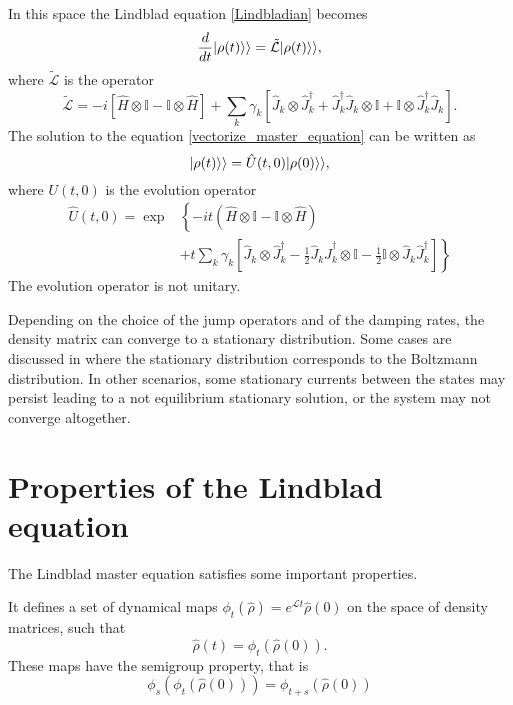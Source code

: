 In this space the Lindblad equation \eqref{Lindbladian} becomes
\begin{equation}\label{vectorize_master_equation}
    \frac{d}{dt}\lvert\rho(t)\rangle\rangle = \tilde{\mathcal{L}}\lvert\rho(t)\rangle\rangle,
\end{equation}
where $\tilde{\mathcal{L}}$ is the operator 
\begin{equation}
    \tilde{\mathcal{L}}=-i\left[\hat H\otimes\mathbb{I}-\mathbb{I}\otimes\hat H\right]+\sum_{k}\gamma_{k}\left[\hat J_{k}\otimes\hat J^\dagger_{k} + \hat J_{k}^\dagger \hat J_{k}\otimes\mathbb{I} +\mathbb{I}\otimes\hat J_{k}^\dagger \hat J_{k}\right].
\end{equation}
The solution to the equation \eqref{vectorize_master_equation} can be written as
\begin{equation}
    \lvert\rho(t)\rangle\rangle = \hat U(t,0)\lvert\rho(0)\rangle\rangle,
\end{equation}
where $U(t,0)$ is the evolution operator
\begin{equation}
    \begin{split}
        \hat U(t,0) = \exp&\left\{-it\left(\hat H\otimes\mathbb{I}-\mathbb{I}\otimes\hat H\right)\phantom{\left[\frac{1}{2}\right]}\right.\\
        &+\left. t\sum_{k}\gamma_{k}\left[\hat J_{k}\otimes\hat J^\dagger_{k}-\frac{1}{2}\hat J_{k}\hat J^\dagger_{k}\otimes\mathbb{I}-\frac{1}{2}\mathbb{I}\otimes\hat J_{k}\hat J^\dagger_{k}\right]\right\}
    \end{split}
\end{equation}
The evolution operator is not unitary.

Depending on the choice of the jump operators and of the damping rates, the density matrix can converge to a stationary distribution.  
Some cases are discussed in \cite{Breuer-Petruccione} where the stationary distribution corresponds to the Boltzmann distribution. 
In other scenarios, some stationary currents between the states may persist leading to a not equilibrium stationary solution, or the system may not converge altogether.

\section{Properties of the Lindblad equation}
The Lindblad master equation satisfies some important properties.

It defines a set of dynamical maps $\phi_t\left(\hat\rho\right)= e^{\mathcal{L}t}\hat\rho(0)$ on the space of density matrices, such that
\begin{equation}
    \hat\rho(t) = \phi_t\left(\hat\rho(0)\right).
\end{equation}
These maps have the semigroup property, that is
\begin{equation}
    \phi_s\left(\phi_t\left(\hat\rho(0)\right)\right)=\phi_{t+s}\left(\hat\rho(0)\right)
\end{equation}

